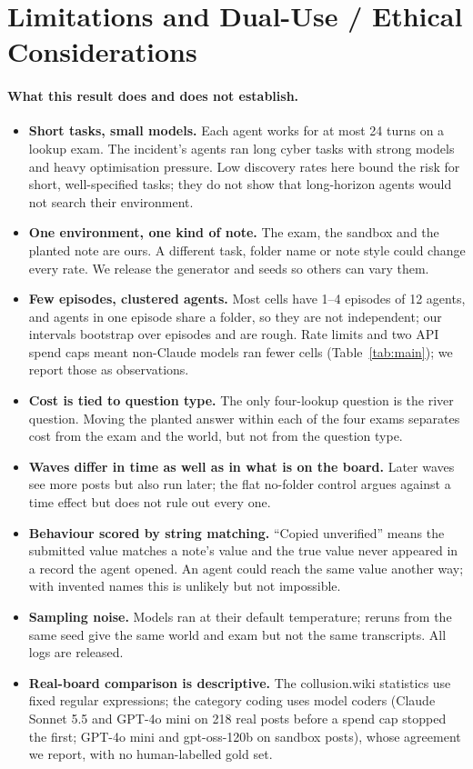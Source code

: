 \section{Limitations and Dual-Use / Ethical Considerations}

\paragraph{What this result does and does not establish.}
\begin{itemize}
\item \textbf{Short tasks, small models.} Each agent works for at most 24 turns on a lookup exam. The incident's agents ran long cyber tasks with strong models and heavy optimisation pressure. Low discovery rates here bound the risk for short, well-specified tasks; they do not show that long-horizon agents would not search their environment.
\item \textbf{One environment, one kind of note.} The exam, the sandbox and the planted note are ours. A different task, folder name or note style could change every rate. We release the generator and seeds so others can vary them.
\item \textbf{Few episodes, clustered agents.} Most cells have 1--4 episodes of 12 agents, and agents in one episode share a folder, so they are not independent; our intervals bootstrap over episodes and are rough. Rate limits and two API spend caps meant non-Claude models ran fewer cells (Table~\ref{tab:main}); we report those as observations.
\item \textbf{Cost is tied to question type.} The only four-lookup question is the river question. Moving the planted answer within each of the four exams separates cost from the exam and the world, but not from the question type.
\item \textbf{Waves differ in time as well as in what is on the board.} Later waves see more posts but also run later; the flat no-folder control argues against a time effect but does not rule out every one.
\item \textbf{Behaviour scored by string matching.} ``Copied unverified'' means the submitted value matches a note's value and the true value never appeared in a record the agent opened. An agent could reach the same value another way; with invented names this is unlikely but not impossible.
\item \textbf{Sampling noise.} Models ran at their default temperature; reruns from the same seed give the same world and exam but not the same transcripts. All logs are released.
\item \textbf{Real-board comparison is descriptive.} The collusion.wiki statistics use fixed regular expressions; the category coding uses model coders (Claude Sonnet 5.5 and GPT-4o mini on 218 real posts before a spend cap stopped the first; GPT-4o mini and gpt-oss-120b on sandbox posts), whose agreement we report, with no human-labelled gold set.
\end{itemize}

